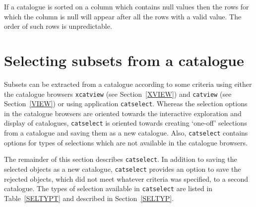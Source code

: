 \documentclass[twoside,11pt]{starlink}
\begin{document}
If a catalogue is sorted on a column which contains null values then the
rows for which the column is null will appear after all the rows with a
valid value. The order of such rows is unpredictable.



\section{\label{SELECT}Selecting subsets from a catalogue}

Subsets can be extracted from a catalogue according to some criteria
using either the catalogue browsers \texttt{xcatview} (see
Section~\ref{XVIEW}) and \texttt{catview} (see Section~\ref{VIEW}) or using
application \texttt{catselect}.  Whereas the selection options in the
catalogue browsers are oriented towards the interactive exploration
and display of catalogues, \texttt{catselect} is oriented towards creating
`one-off' selections from a catalogue and saving them as a new
catalogue.  Also, \texttt{catselect} contains options for types of
selections which are not available in the catalogue browsers.

The remainder of this section describes \texttt{catselect}.  In addition to
saving the selected objects as a new catalogue, \texttt{catselect}
provides an option to save the rejected objects, which did not meet
whatever criteria was specified, to a second catalogue.  The types of
selection available in \texttt{catselect} are listed in Table~\ref{SELTYPT}
and described in Section~\ref{SELTYP}.
\end{document}

